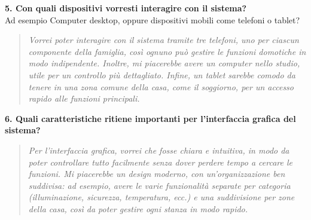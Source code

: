 \documentclass{exam}
\begin{document}
\clearpage
\noindent\textbf{5. Con quali dispositivi vorresti interagire con il sistema?}\\[1mm]
Ad esempio Computer desktop, oppure dispositivi mobili come telefoni o tablet?\\[1.5mm]
\begin{quote}
\emph{Vorrei poter interagire con il sistema tramite tre telefoni, uno per ciascun componente della famiglia, così ognuno può gestire le funzioni domotiche in modo indipendente. Inoltre, mi piacerebbe avere un computer nello studio, utile per un controllo più dettagliato. Infine, un tablet sarebbe comodo da tenere in una zona comune della casa, come il soggiorno, per un accesso rapido alle funzioni principali.}\\
\end{quote}
\clearpage
\noindent\textbf{6. Quali caratteristiche ritiene importanti per l’interfaccia grafica del sistema?}\\[1.5mm]
\begin{quote}
\emph{Per l’interfaccia grafica, vorrei che fosse chiara e intuitiva, in modo da poter controllare tutto facilmente senza dover perdere tempo a cercare le funzioni. Mi piacerebbe un design moderno, con un’organizzazione ben suddivisa: ad esempio, avere le varie funzionalità separate per categoria (illuminazione, sicurezza, temperatura, ecc.) e una suddivisione per zone della casa, così da poter gestire ogni stanza in modo rapido.}
\end{quote}
\end{document}

